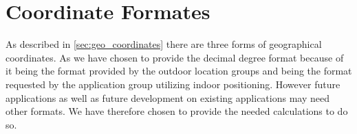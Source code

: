 \section{Coordinate Formates}
As described in \cref{sec:geo_coordinates} there are three forms of geographical coordinates. As we have chosen to provide the decimal degree format because of it being the format provided by the outdoor location groups and being the format requested by the application group utilizing indoor positioning.
However future applications as well as future development on existing applications may need other formats. We have therefore chosen to provide the needed calculations to do so.  